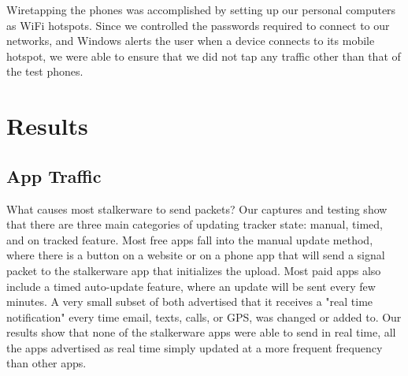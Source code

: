 \documentclass[acmtog]{acmart}
\begin{document}
Wiretapping the phones was accomplished by setting up our personal computers as 
WiFi hotspots. Since we controlled the passwords required to connect to our 
networks, and Windows alerts the user when a device connects to its mobile 
hotspot, we were able to ensure that we did not tap any traffic other than that 
of the test phones. 
\section{Results}
\subsection{App Traffic}

What causes most stalkerware to send packets? Our captures and testing show 
that there are three main categories of updating tracker state: manual, timed, 
and on tracked feature. Most free apps fall into the manual update method, 
where there is a button on a website or on a phone app that will send a signal 
packet to the stalkerware app that initializes the upload. Most paid apps also 
include a timed auto-update feature, where an update will be sent every few 
minutes. A very small subset of both advertised that it receives a "real time 
notification" every time email, texts, calls, or GPS, was changed or added to. 
Our results show that none of the stalkerware apps were able to send in real 
time, all the apps advertised as real time simply updated at a more frequent 
frequency than other apps.
\end{document}
